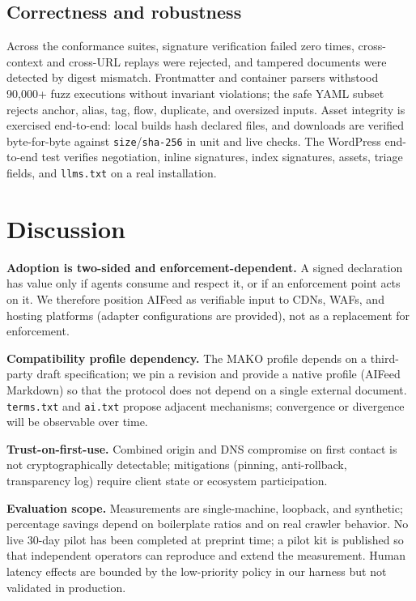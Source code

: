 \documentclass[11pt]{article}
\newcommand{\aifeed}{AIFeed}
\newcommand{\aimd}{AIFeed Markdown}
\newcommand{\mako}{MAKO}
\newcommand{\code}[1]{\texttt{#1}}
\begin{document}
\subsection{Correctness and robustness}

Across the conformance suites, signature verification failed zero times, cross-context
and cross-URL replays were rejected, and tampered documents were detected by digest
mismatch. Frontmatter and container parsers withstood 90{,}000+ fuzz executions without
invariant violations; the safe YAML subset rejects anchor, alias, tag, flow, duplicate,
and oversized inputs. Asset integrity is exercised end-to-end: local builds hash declared
files, and downloads are verified byte-for-byte against \code{size}/\code{sha-256} in
unit and live checks. The WordPress end-to-end test verifies negotiation, inline
signatures, index signatures, assets, triage fields, and \code{llms.txt} on a real
installation.

\section{Discussion}
\label{sec:limitations}

\textbf{Adoption is two-sided and enforcement-dependent.} A signed declaration has value
only if agents consume and respect it, or if an enforcement point acts on it. We
therefore position \aifeed{} as verifiable input to CDNs, WAFs, and hosting platforms
(adapter configurations are provided), not as a replacement for enforcement.

\textbf{Compatibility profile dependency.} The \mako{} profile depends on a third-party
draft specification; we pin a revision and provide a native profile (\aimd{}) so that
the protocol does not depend on a single external document. \code{terms.txt} and
\code{ai.txt} propose adjacent mechanisms; convergence or divergence will be observable
over time.

\textbf{Trust-on-first-use.} Combined origin and DNS compromise on first contact is not
cryptographically detectable; mitigations (pinning, anti-rollback, transparency log)
require client state or ecosystem participation.

\textbf{Evaluation scope.} Measurements are single-machine, loopback, and synthetic;
percentage savings depend on boilerplate ratios and on real crawler behavior. No live
30-day pilot has been completed at preprint time; a pilot kit is published so that
independent operators can reproduce and extend the measurement. Human latency effects
are bounded by the low-priority policy in our harness but not validated in production.
\end{document}
